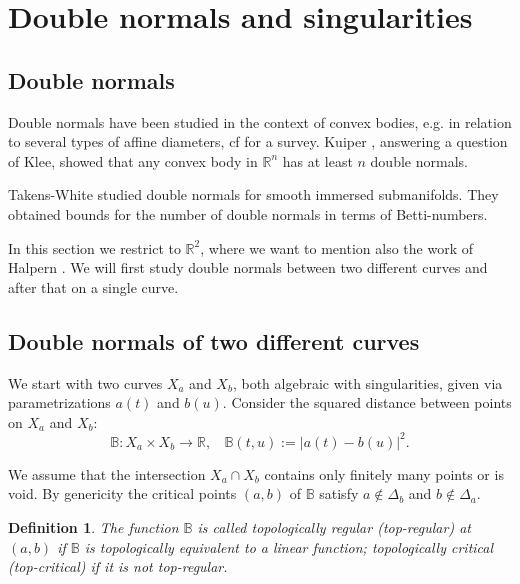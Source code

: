 \documentclass[12pt,a4,twoside]{amsart}
\newtheorem*{main lemma}{The main lemma}
\newtheorem{definition}{Definition}
\begin{document}
\section{Double normals and singularities}\label{s:double}

\subsection{Double normals}


Double normals have been studied in the context of convex bodies, e.g.  in relation to several types of affine diameters, cf \cite{So} for a survey. Kuiper \cite{Kuiper}, answering a question of Klee, showed  that any convex body in $\mathbb{R}^n$ has at least $n$ double normals.


 Takens-White \cite{TW} studied double normals for smooth immersed submanifolds. They obtained bounds for the number of double normals in terms of Betti-numbers.

In this section we restrict to $\mathbb{R}^2$, where we want to mention also the work of Halpern \cite{Halpern1}. We will first study double normals between two different curves and after that on a single curve. 



\subsection{Double normals of two different curves}

We start with two curves $X_a$ and $X_b$, both  algebraic with singularities,  given via parametrizations $a(t)$ and $b(u)$.  Consider the squared distance between points on $X_a$ and $X_b$:
$$\mathbb{B}  : X_a \times X_b \rightarrow  \mathbb{R}, \ \ \ \  \mathbb{B}(t,u):=|a(t)-b(u)|^2.$$

We assume that the intersection $X_a \cap X_b$ contains only finitely many points or is void. By genericity the critical points $(a,b)$ of $\mathbb{B}$ satisfy $a \notin \Delta_b$ and $b \notin \Delta_a$.


\begin{definition}
The function $\mathbb{B}$ is called topologically regular (top-regular) at $(a,b)$ if $\mathbb{B}$ is topologically equivalent to a linear function; topologically critical (top-critical) if it is not top-regular.
\end{definition}
\end{document}
